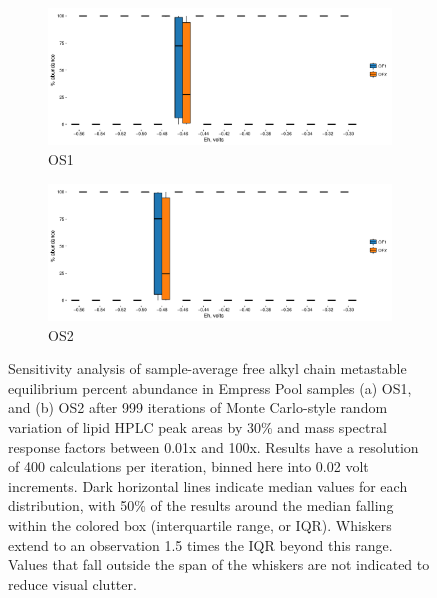\begin{figure}[h]
\centering

    \begin{subfigure}[b]{\linewidth}
      	\includegraphics[width=1\linewidth]{"figs_app2/boxplot_ggplot_02bin Octopus OF1 iter 999"}
      	\caption{OS1}
        \label{fig:OS1_mc}
    \end{subfigure}
    \begin{subfigure}[b]{\linewidth}
    	\includegraphics[width=1\linewidth]{"figs_app2/boxplot_ggplot_02bin Octopus OF2 iter 999"}
    	\caption{OS2}
        \label{fig:OS2_mc}
    \end{subfigure}

    
    \caption{Sensitivity analysis of sample-average free alkyl chain metastable equilibrium percent abundance in Empress Pool samples (a) OS1, and (b) OS2 after 999 iterations of Monte Carlo-style random variation of lipid HPLC peak areas by 30\% and mass spectral response factors between 0.01x and 100x. Results have a resolution of 400 calculations per iteration, binned here into 0.02 volt increments. Dark horizontal lines indicate median values for each distribution, with 50\% of the results around the median falling within the colored box (interquartile range, or IQR). Whiskers extend to an observation 1.5 times the IQR beyond this range. Values that fall outside the span of the whiskers are not indicated to reduce visual clutter.}
    \label{fig:OS_mc}
\end{figure}